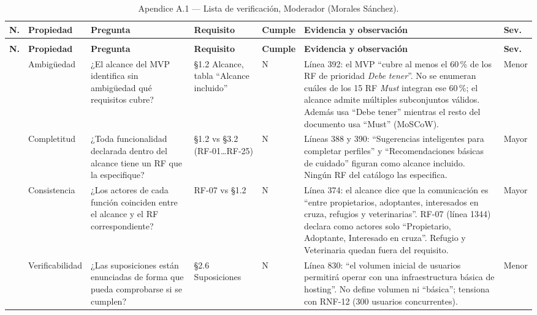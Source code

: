 \documentclass[journal,onecolumn]{IEEEtran}
\begin{document}
	{\scriptsize
		\begin{longtable}{@{}>{\raggedright\arraybackslash}p{0.4cm} >{\raggedright\arraybackslash}p{1.6cm} >{\raggedright\arraybackslash}p{3.0cm} >{\raggedright\arraybackslash}p{2.6cm} >{\raggedright\arraybackslash}p{0.6cm} >{\raggedright\arraybackslash}p{5.4cm} >{\raggedright\arraybackslash}p{1.0cm}@{}}
			\caption{Apendice A.1 --- Lista de verificación, Moderador (Morales Sánchez).}\label{tab:anexoA1}\\
			\toprule
			\textbf{N.\textordmasculine{}} & \textbf{Propiedad} & \textbf{Pregunta} & \textbf{Requisito} & \textbf{Cumple} & \textbf{Evidencia y observación} & \textbf{Sev.} \\
			\midrule
			\endfirsthead
			\multicolumn{7}{@{}l}{\small\itshape Anexo A.1 (continuación)}\\
			\toprule
			\textbf{N.\textordmasculine{}} & \textbf{Propiedad} & \textbf{Pregunta} & \textbf{Requisito} & \textbf{Cumple} & \textbf{Evidencia y observación} & \textbf{Sev.} \\
			\midrule
			\endhead
			\bottomrule
			\endfoot
			1 & Ambigüedad & ¿El alcance del MVP identifica sin ambigüedad qué requisitos cubre? & \S1.2 Alcance, tabla ``Alcance incluido'' & N & Línea 392: el MVP ``cubre al menos el 60\,\% de los RF de prioridad \emph{Debe tener}''. No se enumeran cuáles de los 15 RF \emph{Must} integran ese 60\,\%; el alcance admite múltiples subconjuntos válidos. Además usa ``Debe tener'' mientras el resto del documento usa ``Must'' (MoSCoW). & Menor \\
			2 & Completitud & ¿Toda funcionalidad declarada dentro del alcance tiene un RF que la especifique? & \S1.2 vs \S3.2 (RF-01\ldots RF-25) & N & Líneas 388 y 390: ``Sugerencias inteligentes para completar perfiles'' y ``Recomendaciones básicas de cuidado'' figuran como alcance incluido. Ningún RF del catálogo las especifica. & Mayor \\
			3 & Consistencia & ¿Los actores de cada función coinciden entre el alcance y el RF correspondiente? & RF-07 vs \S1.2 & N & Línea 374: el alcance dice que la comunicación es ``entre propietarios, adoptantes, interesados en cruza, refugios y veterinarias''. RF-07 (línea 1344) declara como actores solo ``Propietario, Adoptante, Interesado en cruza''. Refugio y Veterinaria quedan fuera del requisito. & Mayor \\
			4 & Verificabilidad & ¿Las suposiciones están enunciadas de forma que pueda comprobarse si se cumplen? & \S2.6 Suposiciones & N & Línea 830: ``el volumen inicial de usuarios permitirá operar con una infraestructura básica de hosting''. No define volumen ni ``básica''; tensiona con RNF-12 (300 usuarios concurrentes). & Menor \\

\end{longtable}}
\end{document}
